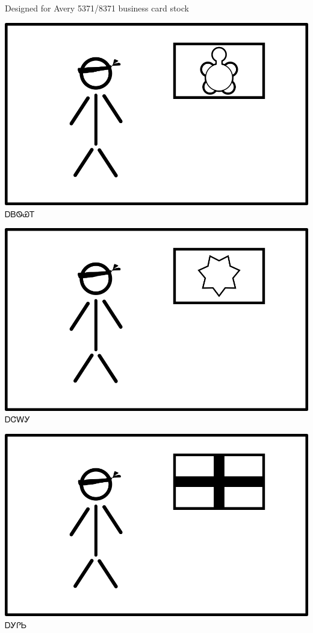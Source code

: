 \documentclass[avery5371]{flashcards}%
\begin{document}
    Designed for Avery 5371/8371 business card stock


    \begin{flashcard}{
        \includegraphics[width=0.95\columnwidth,height=.51\columnwidth,keepaspectratio]{../artwork/flags/adaksi-flag-blind}
    }
        \Huge ᎠᏴᏫᏯᎢ
    \end{flashcard}

    \begin{flashcard}{
        \includegraphics[width=0.95\columnwidth,height=.51\columnwidth,keepaspectratio]{../artwork/flags/ajalagi-flag-blind}
    }
        \Huge ᎠᏣᎳᎩ
    \end{flashcard}

    \begin{flashcard}{
        \includegraphics[width=0.95\columnwidth,height=.51\columnwidth,keepaspectratio]{../artwork/flags/agilisi-flag-blind}
    }
        \Huge ᎠᎩᎵᏏ
    \end{flashcard}
\end{document}
